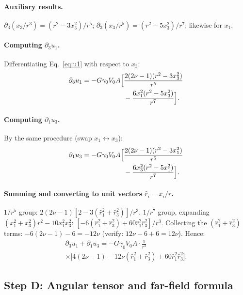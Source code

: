 \documentclass[5p,sort&compress]{elsarticle}
\newcommand{\gz}{\gamma_0}
\begin{document}
\paragraph{Auxiliary results.}
$\partial_3(x_3/r^3)=(r^2-3x_3^2)/r^5$;
$\partial_3(x_3/r^5)=(r^2-5x_3^2)/r^7$; likewise for $x_1$.

\paragraph{Computing $\partial_3u_1$.}
Differentiating Eq.~\eqref{eq:u1} with respect to $x_3$:
\begin{align}
  \partial_3u_1&=-G\gz V_0 A\Bigl[\frac{2(2\nu-1)(r^2-3x_3^2)}{r^5}
    \notag\\
  &\phantom{=-G\gz V_0 A\Bigl[}\;-\frac{6x_1^2(r^2-5x_3^2)}{r^7}\Bigr].
    \label{eq:du1dx3}
\end{align}

\paragraph{Computing $\partial_1u_3$.}
By the same procedure (swap $x_1\leftrightarrow x_3$):
\begin{align}
  \partial_1u_3&=-G\gz V_0 A\Bigl[\frac{2(2\nu-1)(r^2-3x_1^2)}{r^5}
    \notag\\
  &\phantom{=-G\gz V_0 A\Bigl[}\;-\frac{6x_3^2(r^2-5x_1^2)}{r^7}\Bigr].
    \label{eq:du3dx1}
\end{align}

\paragraph{Summing and converting to unit vectors $\hat r_i=x_i/r$.}
$1/r^5$ group:
$2(2\nu-1)[2-3(\hat r_1^2+\hat r_3^2)]/r^3$.
$1/r^7$ group, expanding $(x_1^2+x_3^2)r^2-10x_1^2x_3^2$:
$[-6(\hat r_1^2+\hat r_3^2)+60\hat r_1^2\hat r_3^2]/r^3$.
Collecting the $(\hat r_1^2+\hat r_3^2)$ terms:
$-6(2\nu-1)-6=-12\nu$ (verify: $12\nu-6+6=12\nu$). Hence:
\begin{multline}
  \partial_3u_1+\partial_1u_3=
  -G\gz V_0 A\cdot\frac{1}{r^3}\\
  \times\bigl[4(2\nu-1)-12\nu(\hat r_1^2+\hat r_3^2)
  +60\hat r_1^2\hat r_3^2\bigr].
  \label{eq:gradsum}
\end{multline}

\subsection{Step D: Angular tensor and far-field formula}
\label{sec:stepD}
\end{document}
